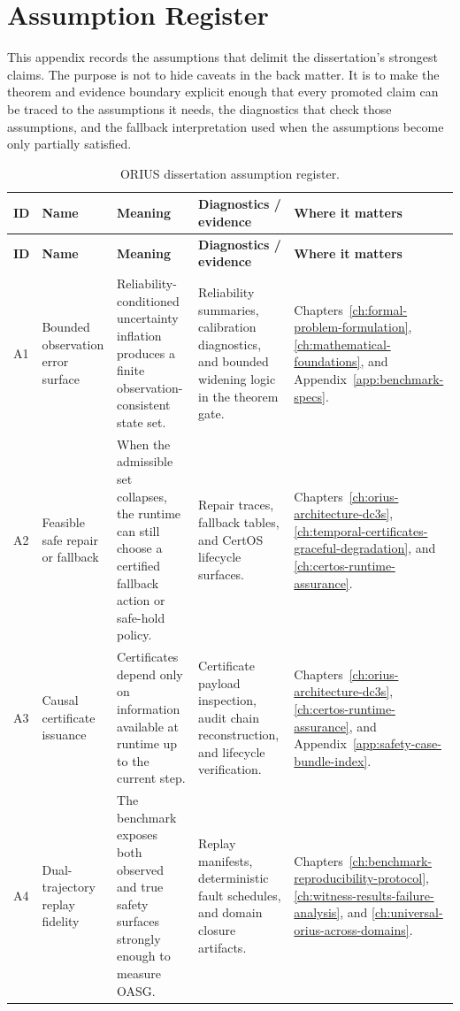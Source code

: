 \chapter{Assumption Register}
\label{app:assumptions}

This appendix records the assumptions that delimit the dissertation's strongest claims. The
purpose is not to hide caveats in the back matter. It is to make the theorem and evidence
boundary explicit enough that every promoted claim can be traced to the assumptions it
needs, the diagnostics that check those assumptions, and the fallback interpretation used
when the assumptions become only partially satisfied.

\begin{longtable}{p{}p{}p{}p{}p{}}
\caption{ORIUS dissertation assumption register.}\label{tab:dissertation-assumptions}\\
\toprule
\textbf{ID} & \textbf{Name} & \textbf{Meaning} & \textbf{Diagnostics / evidence} & \textbf{Where it matters}\\
\midrule
\endfirsthead
\toprule
\textbf{ID} & \textbf{Name} & \textbf{Meaning} & \textbf{Diagnostics / evidence} & \textbf{Where it matters}\\
\midrule
\endhead
A1 & Bounded observation error surface & Reliability-conditioned uncertainty inflation produces a finite observation-consistent state set. & Reliability summaries, calibration diagnostics, and bounded widening logic in the theorem gate. & Chapters~\ref{ch:formal-problem-formulation}, \ref{ch:mathematical-foundations}, and Appendix~\ref{app:benchmark-specs}.\\
A2 & Feasible safe repair or fallback & When the admissible set collapses, the runtime can still choose a certified fallback action or safe-hold policy. & Repair traces, fallback tables, and CertOS lifecycle surfaces. & Chapters~\ref{ch:orius-architecture-dc3s}, \ref{ch:temporal-certificates-graceful-degradation}, and \ref{ch:certos-runtime-assurance}.\\
A3 & Causal certificate issuance & Certificates depend only on information available at runtime up to the current step. & Certificate payload inspection, audit chain reconstruction, and lifecycle verification. & Chapters~\ref{ch:orius-architecture-dc3s}, \ref{ch:certos-runtime-assurance}, and Appendix~\ref{app:safety-case-bundle-index}.\\
A4 & Dual-trajectory replay fidelity & The benchmark exposes both observed and true safety surfaces strongly enough to measure OASG. & Replay manifests, deterministic fault schedules, and domain closure artifacts. & Chapters~\ref{ch:benchmark-reproducibility-protocol}, \ref{ch:witness-results-failure-analysis}, and \ref{ch:universal-orius-across-domains}.\\

\end{longtable}
